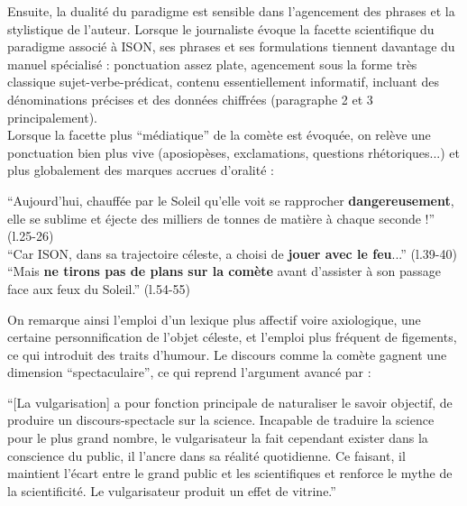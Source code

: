 \documentclass[a4paper,10pt]{article}
\begin{document}
			Ensuite, la dualité du paradigme est sensible dans l'agencement des phrases et la stylistique de l'auteur. Lorsque le journaliste évoque la facette scientifique du paradigme associé à ISON, ses phrases et ses formulations tiennent davantage du manuel spécialisé : ponctuation assez plate, agencement sous la forme très classique sujet-verbe-prédicat, contenu essentiellement informatif, incluant des dénominations précises et des données chiffrées (paragraphe 2 et 3 principalement).\\
			Lorsque la facette plus ``médiatique'' de la comète est évoquée, on relève une ponctuation bien plus vive (aposiopèses, exclamations, questions rhétoriques...) et plus globalement des marques accrues d'oralité :
			\begin{center}
				\footnotesize
				\begin{minipage}{0.7\textwidth}
					``Aujourd'hui, chauffée par le Soleil qu'elle voit se rapprocher \textbf{dangereusement}, elle se sublime et éjecte des milliers de tonnes de matière à chaque seconde !'' (l.25-26)\\
					``Car ISON, dans sa trajectoire céleste, a choisi de \textbf{jouer avec le feu}...'' (l.39-40)\\
					``Mais \textbf{ne tirons pas de plans sur la comète} avant d'assister à son passage face aux feux du Soleil.'' (l.54-55)\\
				\end{minipage}
			\end{center}
			On remarque ainsi l'emploi d'un lexique plus affectif voire axiologique, une certaine personnification de l'objet céleste, et l'emploi plus fréquent de figements, ce qui introduit des traits d'humour. Le discours comme la comète gagnent une dimension ``spectaculaire'', ce qui reprend l'argument avancé par \cite{Jacobi1988}:
			\begin{center}
				\footnotesize
				\begin{minipage}{0.7\textwidth}
					``[La vulgarisation] a pour fonction principale de naturaliser le savoir objectif, de produire un discours-spectacle sur la science. Incapable de traduire la science pour le plus grand nombre, le vulgarisateur la fait cependant exister dans la conscience du public, il l'ancre dans sa réalité quotidienne. Ce faisant, il maintient l'écart entre le grand public et les scientifiques et renforce le mythe de la scientificité. Le vulgarisateur produit un effet de vitrine.''
				\end{minipage}
			\end{center}
\end{document}
